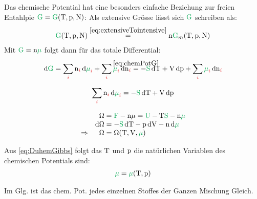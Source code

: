 \begin{sectionbox}\nospacing
  Das chemische Potential hat eine besonders einfache Beziehung zur freien Entahlpie $\Gpot=\Gpot(\Tz,\pz,\Nz)$:
  Als extensive Grösse lässt sich $\Gpot$ schreiben als:
  \begin{align*}
    \Gpot(\Tz,\pz,\Nz)\eqs{\cref{eq:extensiveTointensive}}\nz\Gpot_m(\Tz,\pz,\Nz)
  \end{align*}
  Mit $\Gpot=\nz\mupot$ folgt dann für das totale Differential:
  \begin{align*}
    \diff\Gpot=\sum_{\idxi}\nz_{\idxi}\diff\mupot_{\idxi}+\sum_{\idxi}\mupot_{\idxi}\diff\nz_{\idxi}\eqs{\mathclap{\cref{eq:chemPotG}}}-\Spot\diff\Tz+\Vz\diff\pz+\sum_{\idxi}\mupot_{\idxi}\diff\nz_{\idxi}
  \end{align*}
\end{sectionbox}
\begin{defnbox}\nospacing
  \begin{defn}
    \begin{align}
      \sum_{\idxi}\nz_{\idxi}\diff\mupot_{\idxi}=-\Spot\diff\Tz+\Vz\diff\pz\label{eq:DuhemGibbs}
    \end{align}
  \end{defn}
\end{defnbox}
\begin{sectionbox}\nospacing
  \begin{align*}
              &&\Omega&=\Fpot-\nz\mu=\Upot-\Tz\Spot-\nz\mupot\nalign
              &&\diff\Omega&=-\Spot\diff\Tz-\pz\diff\Vz-\nz\diff\mupot\nalign
    \Rightarrow&&\Omega&=\Omega(\Tz,\Vz,\mupot)
  \end{align*}
\end{sectionbox}
\begin{notebox}[Bemerkungen]\nospacing
  \begin{numberlist}
      \item Aus \cref{eq:DuhemGibbs} folgt das $\mathrm{T}$ und $\mathrm{p}$ die natürlichen Variablen des chemischen Potentials sind:
    \begin{align*}
      \mupot=\mupot(\Tz,\pz)
    \end{align*}
      \item Im Glg. ist das chem. Pot. jedes einzelnen Stoffes der Ganzen Mischung Gleich.
  \end{numberlist}
\end{notebox}
